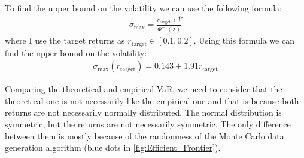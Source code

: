 \documentclass[a4paper,10pt,american]{article}
\begin{document}
To find the upper bound on the volatility we can use the following formula:
\begin{align}
    \sigma_{\text{max}} = \frac{r_{\text{target}}+\bar{V}}{\Phi^{-1}(\lambda)}
\end{align}
where I use the target returns as $r_{\text{target}}\in[0.1,0.2]$. Using this formula we can find the upper bound on the volatility:
\begin{align}
    \sigma_{\text{max}}(r_{\text{target}}) = 0.143 + 1.91 r_{\text{target}}
\end{align}

Comparing the theoretical and empirical VaR, we need to consider that the theoretical one is not necessarily like the empirical one and that is because both returns are not necessarily normally distributed. The normal distribution is symmetric, but the returns are not necessarily symmetric. The only difference between them is mostly because of the randomness of the Monte Carlo data generation algorithm (blue dots in \autoref{fig:Efficient_Frontier}).
























% 
\end{document}
